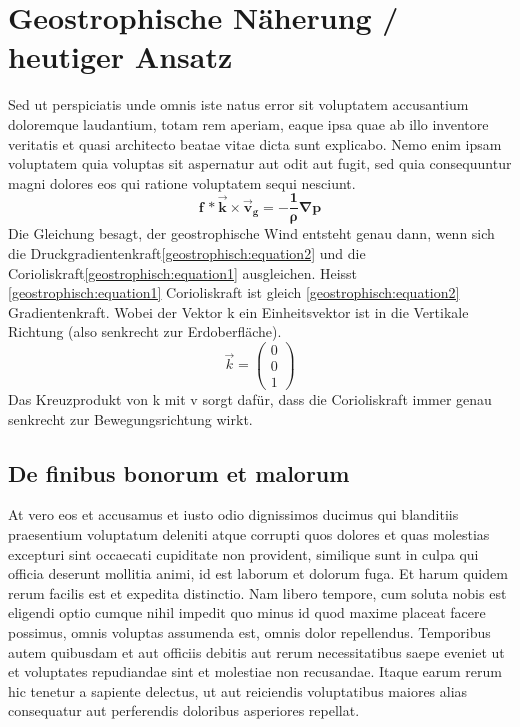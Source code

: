 %
%
%
%
\section{Geostrophische Näherung / heutiger Ansatz
\label{geostrophisch:section:teil3}}
Sed ut perspiciatis unde omnis iste natus error sit voluptatem
accusantium doloremque laudantium, totam rem aperiam, eaque ipsa
quae ab illo inventore veritatis et quasi architecto beatae vitae
dicta sunt explicabo. Nemo enim ipsam voluptatem quia voluptas sit
aspernatur aut odit aut fugit, sed quia consequuntur magni dolores
eos qui ratione voluptatem sequi nesciunt. 
\begin{equation}
\boldsymbol{
f\, *\vec{k} \times \vec{v}_g 
= 
-\frac{1}{\rho} \nabla p
}
\label{geostrophisch:equation3}
\end{equation}
Die Gleichung besagt, der geostrophische Wind entsteht genau dann, wenn sich die Druckgradientenkraft\eqref{geostrophisch:equation2} und die Corioliskraft\eqref{geostrophisch:equation1} ausgleichen.
Heisst \eqref{geostrophisch:equation1} Corioliskraft ist gleich \eqref{geostrophisch:equation2} Gradientenkraft.
Wobei der Vektor k ein Einheitsvektor ist in die Vertikale Richtung (also senkrecht zur Erdoberfläche). 
\begin{equation}
\vec{k} =
\left(
\begin{array}{c}
0 \\
0 \\
1
\end{array}
\right)
\label{geostrophisch:equation4}
\end{equation}
Das Kreuzprodukt von k mit  v sorgt dafür, dass die Corioliskraft immer genau senkrecht zur Bewegungsrichtung wirkt.



\subsection{De finibus bonorum et malorum
\label{geostrophisch:subsection:malorum}}
At vero eos et accusamus et iusto odio dignissimos ducimus qui
blanditiis praesentium voluptatum deleniti atque corrupti quos
dolores et quas molestias excepturi sint occaecati cupiditate non
provident, similique sunt in culpa qui officia deserunt mollitia
animi, id est laborum et dolorum fuga. Et harum quidem rerum facilis
est et expedita distinctio. Nam libero tempore, cum soluta nobis
est eligendi optio cumque nihil impedit quo minus id quod maxime
placeat facere possimus, omnis voluptas assumenda est, omnis dolor
repellendus. Temporibus autem quibusdam et aut officiis debitis aut
rerum necessitatibus saepe eveniet ut et voluptates repudiandae
sint et molestiae non recusandae. Itaque earum rerum hic tenetur a
sapiente delectus, ut aut reiciendis voluptatibus maiores alias
consequatur aut perferendis doloribus asperiores repellat.


